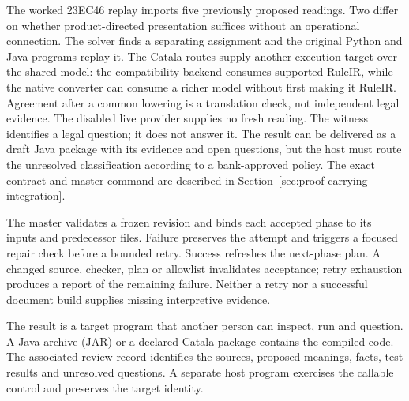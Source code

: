 The worked 23EC46 replay imports five previously proposed readings. Two differ
on whether product-directed presentation suffices without an operational
connection. The solver finds a separating assignment and the original Python
and Java programs replay it. The Catala routes supply another execution target
over the shared model: the compatibility backend consumes supported RuleIR,
while the native converter can consume a richer model without first making it
RuleIR. Agreement after a common lowering is a translation check, not
independent legal evidence. The disabled live provider supplies no fresh
reading. The witness identifies a legal question; it does not answer it.
The result can be delivered
as a draft Java package with its evidence and open questions, but the host must
route the unresolved classification according to a bank-approved policy.
The exact contract and master command are described in
Section~\ref{sec:proof-carrying-integration}.

The master validates a frozen revision and binds each accepted phase to its
inputs and predecessor files.
Failure preserves the attempt and triggers a focused repair check before a
bounded retry. Success refreshes the next-phase plan. A changed source, checker,
plan or allowlist invalidates acceptance; retry exhaustion produces a report of
the remaining failure. Neither a retry nor a successful document build supplies
missing interpretive evidence.

\clearpage
{}
The result is a target program that another person can inspect, run and
question. A Java archive (JAR) or a declared Catala package contains the
compiled code. The associated review record identifies the sources, proposed
meanings, facts, test results and unresolved questions. A separate host program
exercises the callable control and preserves the target identity.

\begin{MapDiagram}
\end{MapDiagram}

